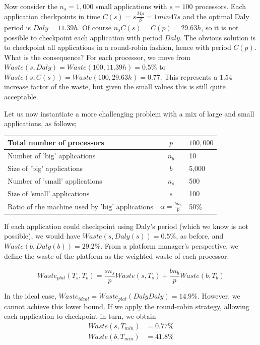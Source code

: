 \documentclass{article}
\newcommand{\ema}[1]{\ensuremath{#1}}
\newcommand{\Waste}{\ema{\mathit{Waste}\xspace}}
\newcommand{\Daly}{\ema{\mathit{Daly}\xspace}}
\begin{document}
Now consider the $n_{s}=1,000$ small applications with $s=100$ processors.
Each application checkpoints in time $C(s) = s\frac{M \rho}{\beta}  = 1min47s$
and the optimal Daly period is $\Daly = 11.39h$. Of course
$n_{s}C(s) =  C(p) = 29.63h$, so it is not possible to checkpoint each application with period
$\Daly$. The obvious solution is to checkpoint all applications in  a round-robin fashion, 
hence with period $C(p)$. What is the consequence? For each processor,
we move from $\Waste(s,\Daly) = \Waste(100,11.39h) = 0.5\%$ to
$\Waste(s,C(s)) = \Waste(100,29.63h) = 0.77$. This represents a $1.54$ increase factor of the waste, but given the small values this is still quite acceptable.

Let us now instantiate a more challenging problem with 
a mix of large and small applications, as follows;

\begin{center}
\begin{tabular}{lcl}
  Total number of processors & $p$ & $100,000$\\\hline
  Number of 'big' applications & $n_{b}$ & 10\\\hline
  Size of 'big' applications & $b$ & 5,000\\\hline
  Number of 'small' applications & $n_{s}$ & 500\\\hline
  Size of 'small' applications & $s$ & 100\\\hline
  Ratio of the machine used by 'big' applications & $\alpha = \frac{b n_{b}}{p} $ & 50\%\\
\end{tabular}
\end{center}

If each application could checkpoint using Daly's period (which we know
is not possible), we would have $Waste(s, Daly(s)) = 0.5\%$, as before,
and $Waste(b, Daly(b)) = 29.2\%$. From a platform manager's perspective, we 
define the waste of the platform as the weighted waste of each processor:

$$\Waste_{plat}(T_s, T_b) = \frac{s n_{s}}{p}\Waste(s, T_s) + \frac{b n_{b}}{p}\Waste(b, T_b)$$

In the ideal case, $\Waste_{ideal} = \Waste_{plat}(\Daly \Daly) = 14.9\%$.
However, we cannot achieve this lower bound. If we apply the round-robin strategy, 
allowing each application to checkpoint in turn, we obtain
$$
\begin{array}{rl}
Waste(s, T_{min}) &= 0.77\%\\
Waste(b, T_{min}) &= 41.8\%\\
\end{array}
$$
\end{document}
